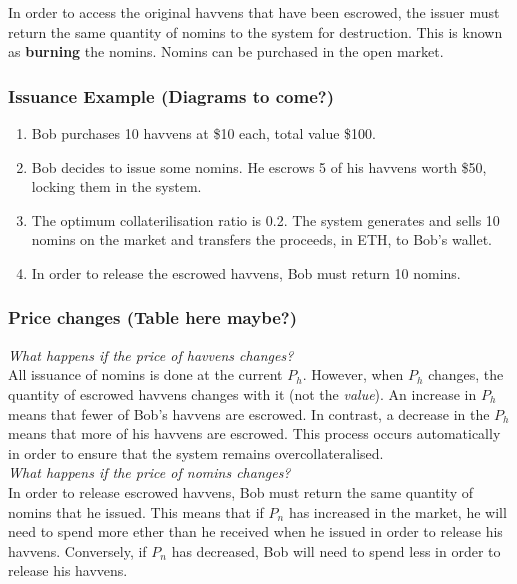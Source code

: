 \noindent In order to access the original havvens that have been escrowed, the issuer must return the same quantity of nomins to the system for destruction. This is known as \textbf{burning} the nomins. Nomins can be purchased in the open market.

\subsubsection{Issuance Example (Diagrams to come?)}

\begin{enumerate}
\item{Bob purchases 10 havvens at \$10 each, total value \$100.}
\item{Bob decides to issue some nomins. He escrows 5 of his havvens worth \$50, locking them in the system.}
\item{The optimum collaterilisation ratio is 0.2. The system generates and sells 10 nomins on the market and transfers the proceeds, in ETH, to Bob's wallet.}
\item{In order to release the escrowed havvens, Bob must return 10 nomins.}
\end{enumerate}

\subsubsection{Price changes (Table here maybe?)}

\noindent \emph{What happens if the price of havvens changes?} \\

\noindent All issuance of nomins is done at the current $P_h$. However, when $P_h$ changes, the quantity of escrowed havvens changes with it (not the \emph{value}). An increase in $P_h$ means that fewer of Bob's havvens are escrowed. In contrast, a decrease in the $P_h$ means that more of his havvens are escrowed. This process occurs automatically in order to ensure that the system remains overcollateralised. \\ 

\noindent \emph{What happens if the price of nomins changes?} \\ 

\noindent In order to release escrowed havvens, Bob must return the same quantity of nomins that he issued. This means that if $P_n$ has increased in the market, he will need to spend more ether than he received when he issued in order to release his havvens. Conversely, if $P_n$ has decreased, Bob will need to spend less in order to release his havvens.

